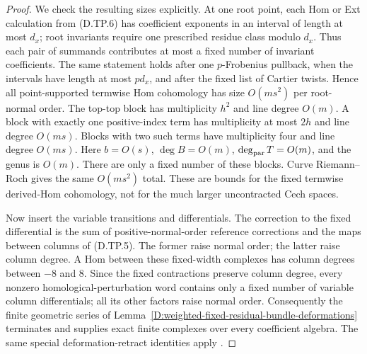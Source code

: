 \begin{proof}
We check the resulting sizes explicitly. At one
root point, each Hom or Ext calculation from
(D.TP.6) has coefficient exponents in an interval
of length at most $d_x$; root invariants require
one prescribed residue class modulo $d_x$.
Thus each pair of summands contributes at most a
fixed number of invariant coefficients. The same
statement holds after one $p$-Frobenius pullback,
when the intervals have length at most $pd_x$,
and after the fixed list of Cartier twists. Hence
all point-supported termwise Hom cohomology has
size $O(ms^2)$ per root-normal order. The top-top
block has multiplicity $h^2$ and line degree
$O(m)$. A block with exactly one positive-index
term has multiplicity at most $2h$ and line
degree $O(ms)$. Blocks with two such terms have
multiplicity four and line degree $O(ms)$.
Here $b=O(s)$, $\deg B=O(m)$,
$\deg_{\rm par}T=O(m)$, and the genus is $O(m)$.
There are only a fixed number of these blocks.
Curve Riemann--Roch gives
the same $O(ms^2)$ total. These are bounds for
the fixed termwise derived-Hom cohomology, not
for the much larger uncontracted Cech spaces.

Now insert the variable transitions and differentials.
The correction to the fixed differential is the
sum of positive-normal-order reference corrections
and the maps between columns of (D.TP.5). The
former raise normal order; the latter raise column
degree. A Hom between these fixed-width complexes
has column degrees between $-8$ and $8$. Since
the fixed contractions preserve column degree,
every nonzero homological-perturbation word
contains only a fixed number of variable column differentials;
all its other factors raise normal order.
Consequently the finite geometric series of
Lemma~\ref{D:weighted-fixed-residual-bundle-deformations}
terminates and supplies exact finite complexes
over every coefficient algebra. The same special
deformation-retract identities apply
\citep[Sections2.1--2.4 and3.2, complete proof]
{C_Crainic2004Perturbation}.


\end{proof}
